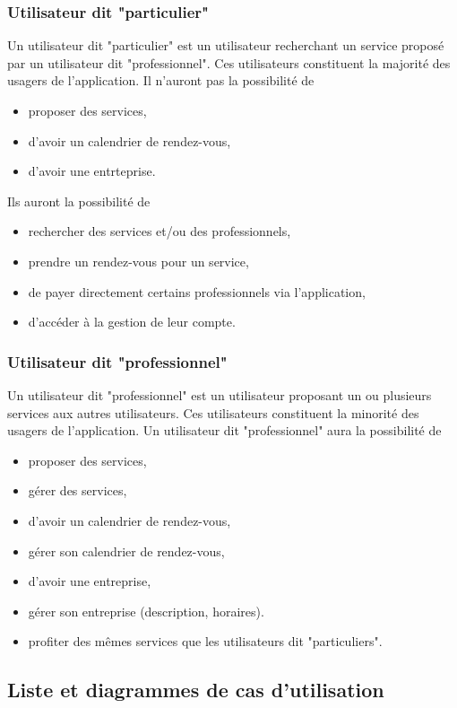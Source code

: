 \documentclass{article}
\begin{document}
\subsubsection{Utilisateur dit "particulier"}
Un utilisateur dit "particulier" est un utilisateur recherchant un service proposé par un utilisateur dit "professionnel".
Ces utilisateurs constituent la majorité des usagers de l'application.
Il n'auront pas la possibilité de
\begin{itemize}
  \item proposer des services,
  \item d'avoir un calendrier de rendez-vous,
  \item d'avoir une entrteprise.
\end{itemize}
Ils auront la possibilité de
\begin{itemize}
  \item rechercher des services et/ou des professionnels,
  \item prendre un rendez-vous pour un service,
  \item de payer directement certains professionnels via l'application,
  \item d'accéder à la gestion de leur compte.
\end{itemize}


\subsubsection{Utilisateur dit "professionnel"}
Un utilisateur dit "professionnel" est un utilisateur proposant un ou plusieurs services aux autres utilisateurs.
Ces utilisateurs constituent la minorité des usagers de l'application.
Un utilisateur dit "professionnel" aura la possibilité de
\begin{itemize}
  \item proposer des services,
  \item gérer des services,
  \item d'avoir un calendrier de rendez-vous,
  \item gérer son calendrier de rendez-vous,
  \item d'avoir une entreprise,
  \item gérer son entreprise (description, horaires).
  \item profiter des mêmes services que les utilisateurs dit "particuliers".
\end{itemize}


\subsection{Liste et diagrammes de cas d'utilisation}
\end{document}
